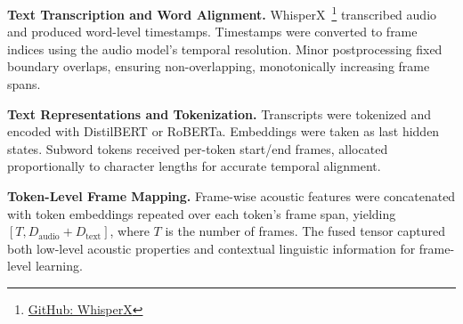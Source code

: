 \documentclass{article}
\begin{document}
{\textbf{Text Transcription and Word Alignment.} WhisperX~\cite{bain2022}\footnote{\href{https://github.com/m-bain/whisperX}{GitHub: WhisperX}} transcribed audio and produced word-level timestamps. Timestamps were converted to frame indices using the audio model’s temporal resolution. Minor postprocessing fixed boundary overlaps, ensuring non-overlapping, monotonically increasing frame spans.


\textbf{Text Representations and Tokenization.} Transcripts were tokenized and encoded with DistilBERT or RoBERTa. Embeddings were taken as last hidden states. Subword tokens received per-token start/end frames, allocated proportionally to character lengths for accurate temporal alignment.


\textbf{Token-Level Frame Mapping.} Frame-wise acoustic features were concatenated with token embeddings repeated over each token's frame span, yielding $[T, D_\text{audio} + D_\text{text}]$, where $T$ is the number of frames. The fused tensor captured both low-level acoustic properties and contextual linguistic information for frame-level learning.
\vspace{1em}


}
\end{document}
